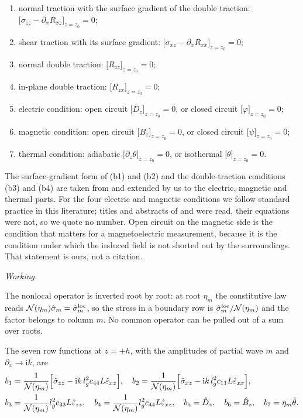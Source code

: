 \documentclass[11pt,a4paper]{article}
\newif\ifshowworked \showworkedtrue
\newenvironment{worked}{\ifshowworked\par\smallskip\noindent\textit{Working.}\par\else\setbox0\vbox\bgroup\fi}{\ifshowworked\par\smallskip\else\egroup\fi}
\newcommand{\Nc}{\mathcal{N}}
\newcommand{\eps}{\varepsilon}
\newcommand{\ii}{\mathrm{i}}
\newcommand{\bt}{\hat\theta}
\begin{document}
\begin{enumerate}
\item[(b1)] normal traction with the surface gradient of the double traction:
$\bigl[\sigma_{zz}-\partial_xR_{xz}\bigr]_{z=z_0}=0$;
\item[(b2)] shear traction with its surface gradient:
$\bigl[\sigma_{xz}-\partial_xR_{xx}\bigr]_{z=z_0}=0$;
\item[(b3)] normal double traction: $\bigl[R_{zz}\bigr]_{z=z_0}=0$;
\item[(b4)] in-plane double traction: $\bigl[R_{zx}\bigr]_{z=z_0}=0$;
\item[(b5)] electric condition: open circuit $\bigl[D_z\bigr]_{z=z_0}=0$, or closed circuit
$\bigl[\varphi\bigr]_{z=z_0}=0$;
\item[(b6)] magnetic condition: open circuit $\bigl[B_z\bigr]_{z=z_0}=0$, or closed circuit
$\bigl[\psi\bigr]_{z=z_0}=0$;
\item[(b7)] thermal condition: adiabatic $\bigl[\partial_z\theta\bigr]_{z=z_0}=0$, or isothermal
$\bigl[\theta\bigr]_{z=z_0}=0$.
\end{enumerate}

The surface-gradient form of (b1) and (b2) and the double-traction conditions (b3) and (b4) are taken from
\cite[Sec.~2, Eq.~(14)]{Charalambopoulos2019} and extended by us to the electric, magnetic and thermal parts.
For the four electric and magnetic conditions we follow standard practice in this literature; titles and
abstracts of \cite{Xiao2016} and \cite{Kondaiah2013} were read, their equations were not, so we quote no
number. Open circuit on the magnetic side is the condition that matters for a magnetoelectric measurement,
because it is the condition under which the induced field is not shorted out by the surroundings. That
statement is ours, not a citation.

\begin{worked}
The nonlocal operator is inverted root by root: at root $\eta_m$ the constitutive law reads
$\Nc(\eta_m)\hat\sigma_m=\hat\sigma^{\rm loc}_m$, so the stress in a boundary row is
$\hat\sigma^{\rm loc}_m/\Nc(\eta_m)$ and the factor belongs to column $m$. No common operator can be pulled
out of a sum over roots.
\end{worked}

\noindent The seven row functions at $z=+h$, with the amplitudes of partial wave $m$ and
$\partial_x\to\ii k$, are
\begin{align}
b_1&=\frac{1}{\Nc(\eta_m)}\Bigl[\hat\sigma_{zz}-\ii k\,l_g^2c_{44}L\hat\eps_{xz}\Bigr],\quad
b_2=\frac{1}{\Nc(\eta_m)}\Bigl[\hat\sigma_{xz}-\ii k\,l_g^2c_{11}L\hat\eps_{xx}\Bigr],
\label{eq:b12}\\
b_3&=\frac{1}{\Nc(\eta_m)}l_g^2c_{33}L\hat\eps_{zz},\quad
b_4=\frac{1}{\Nc(\eta_m)}l_g^2c_{44}L\hat\eps_{xz},\quad
b_5=\hat D_z,\quad b_6=\hat B_z,\quad b_7=\eta_m\bt .
\label{eq:b34567}
\end{align}
\end{document}
